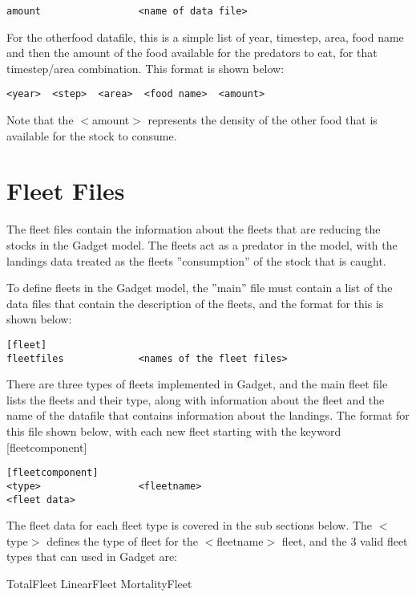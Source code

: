 \documentclass [a4paper, 10pt]{book}
\begin{document}
{\small\begin{verbatim}
amount                 <name of data file>
\end{verbatim}}

For the otherfood datafile, this is a simple list of year, timestep, area, food name and then the amount of the food available for the predators to eat, for that timestep/area combination.  This format is shown below:

{\small\begin{verbatim}
<year>  <step>  <area>  <food name>  <amount>
\end{verbatim}}

Note that the $<$amount$>$ represents the density of the other food that is available for the stock to consume.

\chapter{Fleet Files}\label{chap:fleet}
The fleet files contain the information about the fleets that are reducing the stocks in the Gadget model.  The fleets act as a predator in the model, with the landings data treated as the fleets ''consumption'' of the stock that is caught.

\bigskip
To define fleets in the Gadget model, the ''main'' file must contain a list of the data files that contain the description of the fleets, and the format for this is shown below:

{\small\begin{verbatim}
[fleet]
fleetfiles             <names of the fleet files>
\end{verbatim}}

There are three types of fleets implemented in Gadget, and the main fleet file lists the fleets and their type, along with information about the fleet and the name of the datafile that contains information about the landings.  The format for this file shown below, with each new fleet starting with the keyword [fleetcomponent]

{\small\begin{verbatim}
[fleetcomponent]
<type>                 <fleetname>
<fleet data>
\end{verbatim}}

The fleet data for each fleet type is covered in the sub sections below.  The $<$type$>$ defines the type of fleet for the $<$fleetname$>$ fleet, and the 3 valid fleet types that can used in Gadget are:

\bigskip
TotalFleet\newline
LinearFleet\newline
MortalityFleet
\end{document}
